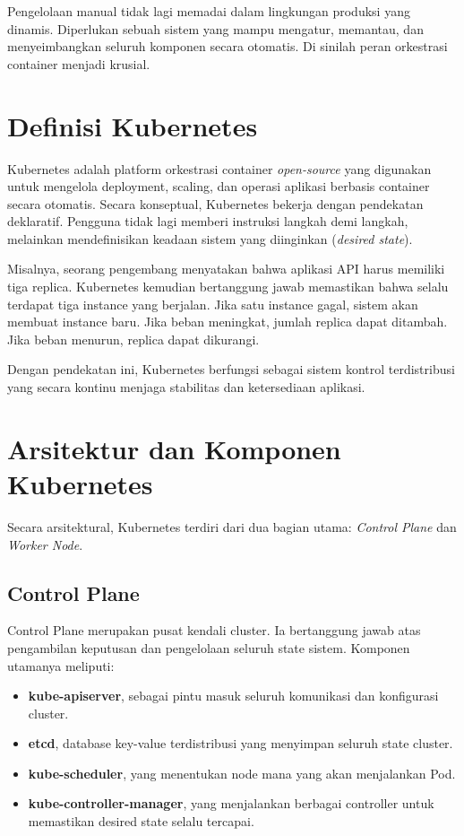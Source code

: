 Pengelolaan manual tidak lagi memadai dalam lingkungan produksi yang dinamis. 
Diperlukan sebuah sistem yang mampu mengatur, memantau, dan menyeimbangkan seluruh komponen secara otomatis. 
Di sinilah peran orkestrasi container menjadi krusial.

\section{Definisi Kubernetes}

Kubernetes adalah platform orkestrasi container \textit{open-source} yang digunakan untuk mengelola deployment, scaling, dan operasi aplikasi berbasis container secara otomatis. 
Secara konseptual, Kubernetes bekerja dengan pendekatan deklaratif. 
Pengguna tidak lagi memberi instruksi langkah demi langkah, melainkan mendefinisikan keadaan sistem yang diinginkan (\textit{desired state}).

Misalnya, seorang pengembang menyatakan bahwa aplikasi API harus memiliki tiga replica. 
Kubernetes kemudian bertanggung jawab memastikan bahwa selalu terdapat tiga instance yang berjalan. 
Jika satu instance gagal, sistem akan membuat instance baru. 
Jika beban meningkat, jumlah replica dapat ditambah. 
Jika beban menurun, replica dapat dikurangi.

Dengan pendekatan ini, Kubernetes berfungsi sebagai sistem kontrol terdistribusi yang secara kontinu menjaga stabilitas dan ketersediaan aplikasi.

\section{Arsitektur dan Komponen Kubernetes}

Secara arsitektural, Kubernetes terdiri dari dua bagian utama: \textit{Control Plane} dan \textit{Worker Node}.

\subsection{Control Plane}

Control Plane merupakan pusat kendali cluster. 
Ia bertanggung jawab atas pengambilan keputusan dan pengelolaan seluruh state sistem. 
Komponen utamanya meliputi:

\begin{itemize}
    \item \textbf{kube-apiserver}, sebagai pintu masuk seluruh komunikasi dan konfigurasi cluster.
    \item \textbf{etcd}, database key-value terdistribusi yang menyimpan seluruh state cluster.
    \item \textbf{kube-scheduler}, yang menentukan node mana yang akan menjalankan Pod.
    \item \textbf{kube-controller-manager}, yang menjalankan berbagai controller untuk memastikan desired state selalu tercapai.
\end{itemize}

